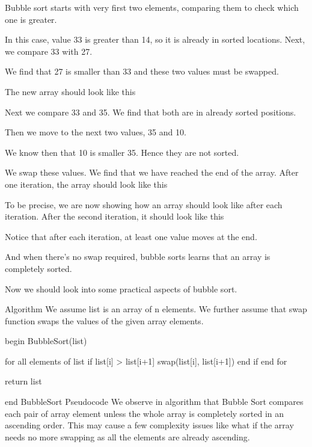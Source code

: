 Bubble sort starts with very first two elements, comparing them to check which one is greater.



In this case, value 33 is greater than 14, so it is already in sorted locations. Next, we compare 33 with 27.



We find that 27 is smaller than 33 and these two values must be swapped.



The new array should look like this



Next we compare 33 and 35. We find that both are in already sorted positions.



Then we move to the next two values, 35 and 10.



We know then that 10 is smaller 35. Hence they are not sorted.



We swap these values. We find that we have reached the end of the array. After one iteration, the array should look like this



To be precise, we are now showing how an array should look like after each iteration. After the second iteration, it should look like this



Notice that after each iteration, at least one value moves at the end.



And when there's no swap required, bubble sorts learns that an array is completely sorted.



Now we should look into some practical aspects of bubble sort.

Algorithm
We assume list is an array of n elements. We further assume that swap function swaps the values of the given array elements.

begin BubbleSort(list)

   for all elements of list
      if list[i] > list[i+1]
         swap(list[i], list[i+1])
      end if
   end for

   return list

end BubbleSort
Pseudocode
We observe in algorithm that Bubble Sort compares each pair of array element unless the whole array is completely sorted in an ascending order. This may cause a few complexity issues like what if the array needs no more swapping as all the elements are already ascending.

